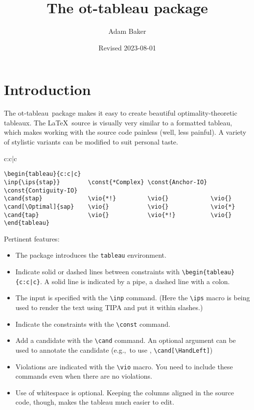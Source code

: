 \documentclass{article}
\title{The \textsf{ot-tableau} package}
\date{Revised 2023-08-01}
\author{Adam Baker}
\def\eg{e.g.,~}
\def\tabl{\textsf{ot-tableau}}
\begin{document}
\maketitle

\section{Introduction}
The \tabl\ package makes it easy to create beautiful optimality-theoretic tableaux. The \LaTeX\ source is visually very similar to a formatted tableau, which makes working with the source code painless (well, less painful). A variety of stylistic variants can be modified to suit personal taste.

\begin{center}
	\begin{tableau}{c:c|c}
	          
	             \vio{*!}         \vio{}            \vio{}
	    \vio{}           \vio{}            \vio{*}
	              \vio{}           \vio{*!}          \vio{}
	\end{tableau}
\end{center}

\begin{verbatim}
\begin{tableau}{c:c|c}
\inp{\ips{stap}}        \const{*Complex} \const{Anchor-IO} \const{Contiguity-IO}
\cand{stap}             \vio{*!}         \vio{}            \vio{}
\cand[\Optimal]{sap}    \vio{}           \vio{}            \vio{*}
\cand{tap}              \vio{}           \vio{*!}          \vio{}
\end{tableau}
\end{verbatim}
Pertinent features:
\begin{itemize}
\item The package introduces the \verb+tableau+ environment.
\item Indicate solid or dashed lines between constraints with \verb+\begin{tableau}{c:c|c}+. A solid line is indicated by a pipe, a dashed line with a colon.
\item The input is specified with the \verb+\inp+ command. (Here the \verb+\ips+ macro is being used to render the text using TIPA and put it within slashes.)
\item Indicate the constraints with the \verb+\const+ command.
\item Add a candidate with the \verb+\cand+ command. An optional argument can be used to annotate the candidate (\eg to use \HandLeft, \verb+\cand[\HandLeft]+)
\item Violations are indicated with the \verb+\vio+ macro. You need to include these commands even when there are no violations.
\item Use of whitespace is optional. Keeping the columns aligned in the source code, though, makes the tableau much easier to edit.
\end{itemize}
\end{document}
